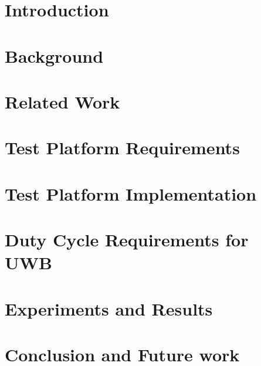 \documentclass[a4paper,10pt,twoside]{report}
\begin{document}

\lstlistoflistings

\clearemptydoublepage
\chapter{Introduction}\label{chapter:introduction}
\setcounter{page}{0}


\clearemptydoublepage
\chapter{Background}\label{chapter:background}

\clearemptydoublepage

\chapter{Related Work}\label{chapter:relatedWork}

\clearemptydoublepage

\chapter{Test Platform Requirements}\label{chapter:testPlatformRequirements}

\clearemptydoublepage

\chapter{Test Platform Implementation}\label{chapter:testPlatformImplementation}

\clearemptydoublepage

\chapter{Duty Cycle Requirements for UWB}\label{chapter:dutycyclerequirements}

\clearemptydoublepage


\chapter{Experiments and Results}\label{chapter:experimentsAndResults}

\clearemptydoublepage

\chapter{Conclusion and Future work}\label{chapter:conclusionAndFutureWork}

\clearemptydoublepage
\end{document}

